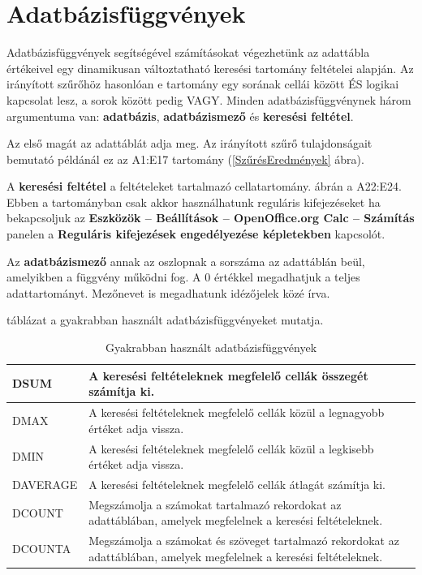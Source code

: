 \chapter{Adatbázisfüggvények}
\thispagestyle{empty}

Adatbázisfüggvények segítségével számításokat
végezhetünk az adattábla értékeivel egy dinamikusan
változtatható keresési tartomány feltételei alapján. Az
irányított szűrőhöz hasonlóan e tartomány egy
sorának cellái között ÉS logikai kapcsolat lesz, a sorok
között pedig VAGY. Minden adatbázisfüggvénynek három
argumentuma van: \textbf{adatbázis}, \textbf{adatbázismező}
és \textbf{keresési feltétel}.

Az első magát az adattáblát adja meg. Az irányított
szűrő tulajdonságait bemutató példánál ez az A1:E17
tartomány (\ref{SzűrésEredmények} ábra).

A \textbf{keresési feltétel} a feltételeket tartalmazó
cellatartomány.  ábrán a A22:E24.
Ebben a tartományban csak akkor használhatunk reguláris
kifejezéseket ha bekapcsoljuk az
\textbf{Eszközök --  Beállítások --  OpenOffice.org Calc --
Számítás} panelen a \textbf{Reguláris kifejezések
engedélyezése képletekben} kapcsolót.

Az \textbf{adatbázismező} annak az oszlopnak a sorszáma az
adattáblán beül, amelyikben a függvény működni fog. A 0
értékkel megadhatjuk a teljes adattartományt. Mezőnevet is
megadhatunk idézőjelek közé írva.


 táblázat a gyakrabban használt
adatbázisfüggvényeket mutatja.

\begin{table}[!h]
\begin{center}
\caption{Gyakrabban használt adatbázisfüggvények}\label{AdatbázisFüggvények}
\begin{tabular}{|m{2.5cm}|m{8cm}|}
\hline
DSUM &
A keresési feltételeknek megfelelő cellák összegét
számítja ki.\\ \hline
DMAX &
A keresési feltételeknek megfelelő cellák közül a
legnagyobb értéket adja vissza.\\ \hline
DMIN &
A keresési feltételeknek megfelelő cellák közül a
legkisebb értéket adja vissza.\\ \hline
DAVERAGE &
A keresési feltételeknek megfelelő cellák átlagát
számítja ki.\\ \hline
DCOUNT &
Megszámolja a számokat tartalmazó rekordokat az adattáblában,
amelyek megfelelnek a keresési feltételeknek.\\ \hline
DCOUNTA &
Megszámolja a számokat és szöveget tartalmazó rekordokat az
adattáblában, amelyek megfelelnek a keresési
feltételeknek.\\ \hline
\end{tabular}
\end{center}
\end{table}

